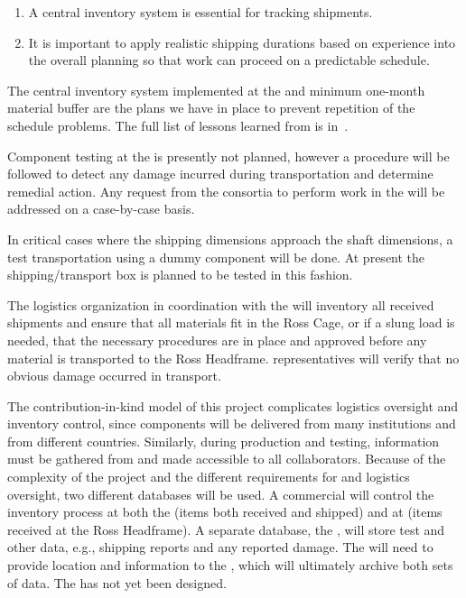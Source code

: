 \begin{enumerate}
\item A central inventory system is essential for tracking  shipments.
\item 
It is important to apply realistic shipping durations based on experience into the overall planning so that work can proceed on a predictable schedule. 
 
\end{enumerate}

The central inventory system  implemented at the   and minimum one-month material buffer are the plans we have in place to prevent repetition of the  schedule problems. 
The full list of lessons learned from  is in~\cite{bib:docdb8255}. 

Component testing at the  is presently not planned, however a   procedure will be followed to detect any damage incurred during transportation and determine remedial action. Any request from the consortia to perform work in the  will be addressed on a case-by-case basis.

In critical cases where the shipping dimensions approach the shaft dimensions, a test transportation using a dummy component will be done. At present the  shipping/transport box is planned to be tested in this fashion.
 
The logistics organization in coordination with the   will inventory all received shipments and  ensure that all materials fit in the Ross Cage, or if a slung load is needed, that the necessary procedures are in place and approved before any material is transported to the Ross Headframe.  
 representatives will verify that no obvious damage occurred in transport. 

The contribution-in-kind model of this project complicates logistics oversight and inventory control, since components will be delivered from many institutions and from different countries. 
Similarly, during production and testing,  information must be gathered from and made accessible to all collaborators. 
Because of the complexity of the project and the different requirements for  and logistics oversight, two different databases will be used. 
A commercial  will control the inventory process at both the  (items both received and shipped) and at  (items received at the Ross Headframe). 
A  separate database, the , will store test and other  data, e.g.,  shipping reports and any reported damage. 
The  will need to provide location and   information to the , which will ultimately archive both sets of data. 
The  has not yet been designed.

